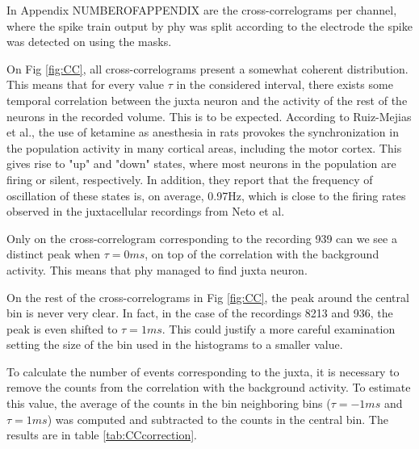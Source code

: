 \documentclass{article}
\begin{document}
In Appendix NUMBEROFAPPENDIX are the cross-correlograms per channel, where the spike train output by phy was split according to the electrode the spike was detected on using the masks.

On Fig \ref{fig:CC}, all cross-correlograms present a somewhat coherent distribution. This means that for every value $\tau$ in the considered interval, there exists some temporal correlation between the juxta neuron and the activity of the rest of the neurons in the recorded volume. This is to be expected. According to Ruiz-Mejias et al., the use of ketamine as anesthesia in rats provokes the synchronization in the population activity in many cortical areas, including the motor cortex. This gives rise to "up" and "down" states, where most neurons in the population are firing or silent, respectively. In addition, they report that the frequency of oscillation of these states is, on average, 0.97Hz, which is close to the firing rates observed in the juxtacellular recordings from Neto et al. 

Only on the cross-correlogram corresponding to the recording 939 can we see a distinct peak when $\tau=0 ms$, on top of the correlation with the background activity. This means that phy managed to find juxta neuron.

On the rest of the cross-correlograms in Fig \ref{fig:CC}, the peak around the central bin is never very clear. In fact, in the case of the recordings 8213 and 936, the peak is even shifted to $\tau=1 ms$. This could justify a more careful examination setting the size of the bin used in the histograms to a smaller value.

To calculate the number of events corresponding to the juxta, it is necessary to remove the counts from the correlation with the background activity. To estimate this value, the average of the counts in the bin neighboring bins ($\tau = -1ms$ and $\tau = 1 ms$) was computed and subtracted to the counts in the central bin. The results are in table \ref{tab:CCcorrection}.
\end{document}
